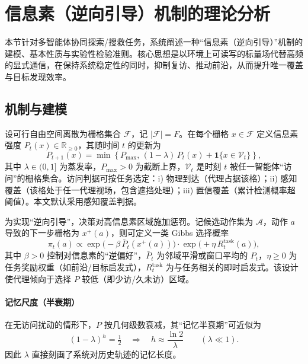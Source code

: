 \section{信息素（逆向引导）机制的理论分析}
\label{sec:pheromone_theory}

本节针对多智能体协同探索/搜救任务，系统阐述一种“信息素（逆向引导）”机制的建模、基本性质与实验性检验准则。核心思想是以环境上可读写的标量场代替高频的显式通信，在保持系统稳定性的同时，抑制复访、推动前沿，从而提升唯一覆盖与目标发现效率。

\subsection{机制与建模}
设可行自由空间离散为栅格集合 $\mathcal{F}$，记 $\lvert\mathcal{F}\rvert = F$。在每个栅格 $x\in\mathcal{F}$ 定义信息素强度 $P_t(x)\in\mathbb{R}_{\ge 0}$，其随时间 $t$ 的更新为
\begin{equation}
\label{eq:update}
P_{t+1}(x)=\min\left\{P_{\max},\,(1-\lambda)\,P_t(x)+\mathbf{1}\{x\in\mathcal{V}_t\}\right\},
\end{equation}
其中 $\lambda\in(0,1]$ 为蒸发率，$P_{\max}>0$ 为截断上界，$\mathcal{V}_t$ 是时刻 $t$ 被任一智能体“访问”的栅格集合。访问判据可按任务选定：i) 物理到达（代理占据该格）；ii) 感知覆盖（该格处于任一代理视场，包含遮挡处理）；iii) 置信覆盖（累计检测概率超阈值）。本文默认采用感知覆盖判据。

为实现“逆向引导”，决策对高信息素区域施加惩罚。记候选动作集为 $\mathcal{A}$，动作 $a$ 导致的下一步栅格为 $x^+(a)$，则可定义一类 Gibbs 选择概率
\begin{equation}
\label{eq:policy}
\pi_t(a)\propto \exp\big(-\beta\,\bar{P}_t(x^+(a))\big)\cdot \exp\big(+\eta\,R^{\text{task}}_t(a)\big),
\end{equation}
其中 $\beta>0$ 控制对信息素的“逆偏好”，$\bar{P}_t$ 为邻域平滑或窗口平均的 $P_t$，$\eta\ge 0$ 为任务奖励权重（如前沿/目标启发式），$R^{\text{task}}_t$ 为与任务相关的即时启发式。该设计使代理倾向于选择 $P$ 较低（即少访/久未访）区域。

\paragraph{记忆尺度（半衰期）}
在无访问扰动的情形下，$P$ 按几何级数衰减，其“记忆半衰期”可近似为
\begin{equation}
(1-\lambda)^h=\tfrac{1}{2}\quad\Rightarrow\quad h\approx \frac{\ln 2}{\lambda}\qquad(\lambda\ll 1).
\end{equation}
因此 $\lambda$ 直接刻画了系统对历史轨迹的记忆长度。

